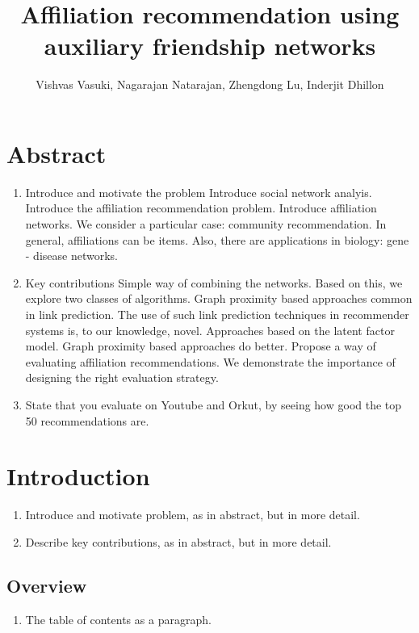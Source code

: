 \documentclass[11pt]{article}
\title{Affiliation recommendation using auxiliary friendship networks}
\author{Vishvas Vasuki, Nagarajan Natarajan, Zhengdong Lu, Inderjit Dhillon}
\begin{document}
\maketitle

\section{Abstract}
\begin{enumerate}
 \item Introduce and motivate the problem
 \subitem Introduce social network analyis.
 \subitem Introduce the affiliation recommendation problem.
 \subitem Introduce affiliation networks.
 \subitem We consider a particular case: community recommendation.
 \subitem In general, affiliations can be items. Also, there are applications in biology: gene - disease networks.
 
 \item Key contributions
 \subitem Simple way of combining the networks. Based on this, we explore two classes of algorithms.
 \subsubitem Graph proximity based approaches common in link prediction. The use of such link prediction techniques in recommender systems is, to our knowledge, novel.
 \subsubitem Approaches based on the latent factor model.
 \subsubitem Graph proximity based approaches do better.
 \subitem Propose a way of evaluating affiliation recommendations. We demonstrate the importance of designing the right evaluation strategy.
 
 \item State that you evaluate on Youtube and Orkut, by seeing how good the top 50 recommendations are.
\end{enumerate}

\section{Introduction}
\begin{enumerate}
 \item Introduce and motivate problem, as in abstract, but in more detail.
 \item Describe key contributions, as in abstract, but in more detail.
\end{enumerate}

\subsection{Overview}
\begin{enumerate}
 \item The table of contents as a paragraph.
\end{enumerate}
\end{document}
